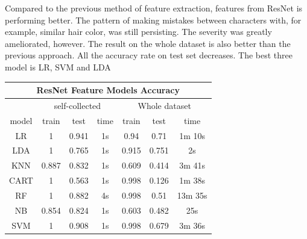 \documentclass[11.5pt]{article}
\begin{document}
\begin{enumerate}
\begin{itemize}
            \vspace{3mm}
            \begin{minipage}{0.35\textwidth}
                Compared to the previous method of feature extraction, features from ResNet is performing better.
                The pattern of making mistakes between characters with, for example, similar hair color, was still persisting.
                The severity was greatly ameliorated, however.
                The result on the whole dataset is also better than the previous approach.
                All the accuracy rate on test set decreases.
                The best three model is LR, SVM and LDA
            \end{minipage}
            \begin{minipage}{0.5\textwidth}
                \begin{tabular}{|c|c|c|c|c|c|c|}
                    \multicolumn{7}{c}{\textbf{ResNet Feature Models Accuracy} }\\
                    \hline
                    & \multicolumn{3}{|c|}{self-collected} & \multicolumn{3}{|c|}{Whole dataset} \\ \hline
                    model & train & test & time & train & test & time \\ \hline
                    LR & 1 & 0.941 & 1s & 0.94 & 0.71 & 1m 10s \\ \hline
                    LDA & 1 & 0.765 & 1s & 0.915 & 0.751 & 2s \\ \hline
                    KNN & 0.887 & 0.832 & 1s & 0.609 & 0.414 & 3m 41s \\ \hline
                    CART & 1 & 0.563 & 1s & 0.998 & 0.126 & 1m 38s \\ \hline
                    RF & 1 & 0.882 & 4s & 0.998 & 0.51 & 13m 35s\\ \hline
                    NB & 0.854 & 0.824 & 1s & 0.603 & 0.482 & 25s \\ \hline
                    SVM & 1 & 0.908 & 1s & 0.998 & 0.679 & 3m 36s \\ \hline
                \end{tabular}
            \end{minipage}



\end{itemize}
\end{enumerate}
\end{document}
